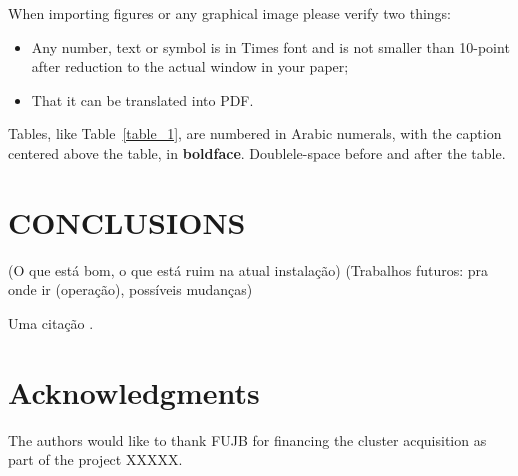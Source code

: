 \documentclass[twoside,a4paper,12pt,english]{inac17}
\begin{document}
When importing figures or any graphical image please verify two things:

\begin{itemize}

\item Any number, text or symbol is in Times font and is not smaller than 10-point after reduction to the actual window in your paper;

\item That it can be translated into PDF.

\end{itemize}



Tables, like Table~\ref{table_1}, are numbered in Arabic numerals, with the caption centered above the table, in {\bf boldface}.  Doublele-space before and after the table.


\section{CONCLUSIONS}

(O que está bom, o que está ruim na atual instalação)
(Trabalhos futuros: pra onde ir (operação), possíveis mudanças)

Uma citação \cite{Henderson17}.


\section*{Acknowledgments}
The authors would like to thank FUJB for financing the cluster acquisition
as part of the project XXXXX.











\end{document}
